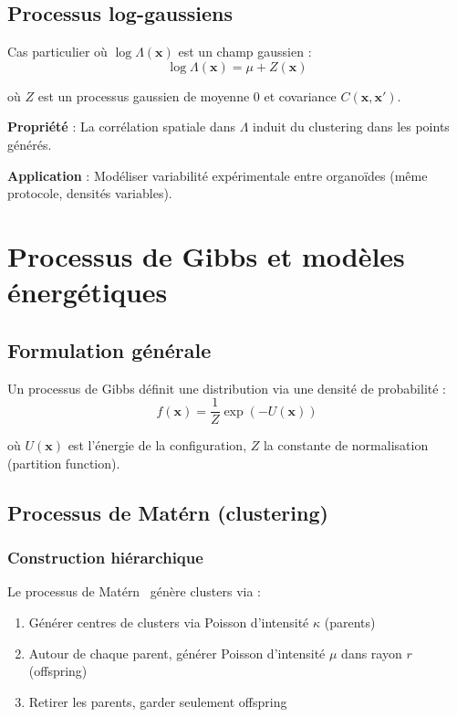\subsection{Processus log-gaussiens}

Cas particulier où $\log \Lambda(\mathbf{x})$ est un champ gaussien :
\[
\log \Lambda(\mathbf{x}) = \mu + Z(\mathbf{x})
\]

où $Z$ est un processus gaussien de moyenne 0 et covariance $C(\mathbf{x}, \mathbf{x}')$.

\textbf{Propriété} : La corrélation spatiale dans $\Lambda$ induit du clustering dans les points générés.

\textbf{Application} : Modéliser variabilité expérimentale entre organoïdes (même protocole, densités variables).

\section{Processus de Gibbs et modèles énergétiques}

\subsection{Formulation générale}

Un processus de Gibbs définit une distribution via une densité de probabilité :
\[
f(\mathbf{x}) = \frac{1}{Z} \exp(-U(\mathbf{x}))
\]

où $U(\mathbf{x})$ est l'énergie de la configuration, $Z$ la constante de normalisation (partition function).

\subsection{Processus de Matérn (clustering)}

\subsubsection{Construction hiérarchique}

Le processus de Matérn~\cite{Matern1960} génère clusters via :
\begin{enumerate}
    \item Générer centres de clusters via Poisson d'intensité $\kappa$ (parents)
    \item Autour de chaque parent, générer Poisson d'intensité $\mu$ dans rayon $r$ (offspring)
    \item Retirer les parents, garder seulement offspring
\end{enumerate}

